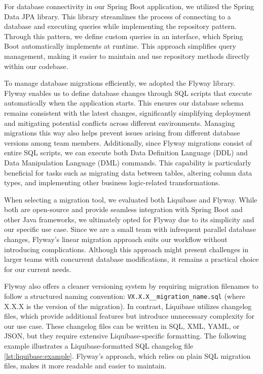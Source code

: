 For database connectivity in our Spring Boot application, we utilized the Spring Data JPA library. This library streamlines the process of connecting to a database and executing queries while implementing the repository pattern. Through this pattern, we define custom queries in an interface, which Spring Boot automatically implements at runtime. This approach simplifies query management, making it easier to maintain and use repository methods directly within our codebase.

To manage database migrations efficiently, we adopted the Flyway library. Flyway enables us to define database changes through SQL scripts that execute automatically when the application starts. This ensures our database schema remains consistent with the latest changes, significantly simplifying deployment and mitigating potential conflicts across different environments. Managing migrations this way also helps prevent issues arising from different database versions among team members. Additionally, since Flyway migrations consist of entire SQL scripts, we can execute both Data Definition Language (DDL) and Data Manipulation Language (DML) commands. This capability is particularly beneficial for tasks such as migrating data between tables, altering column data types, and implementing other business logic-related transformations.

When selecting a migration tool, we evaluated both Liquibase and Flyway. While both are open-source and provide seamless integration with Spring Boot and other Java frameworks, we ultimately opted for Flyway due to its simplicity and our specific use case. Since we are a small team with infrequent parallel database changes, Flyway’s linear migration approach suits our workflow without introducing complications. Although this approach might present challenges in larger teams with concurrent database modifications, it remains a practical choice for our current needs.

Flyway also offers a cleaner versioning system by requiring migration filenames to follow a structured naming convention: \texttt{VX.X.X\_\_migration\_name.sql} (where X.X.X is the version of the migration). In contrast, Liquibase utilizes changelog files, which provide additional features but introduce unnecessary complexity for our use case. These changelog files can be written in SQL, XML, YAML, or JSON, but they require extensive Liquibase-specific formatting. The following example illustrates a Liquibase-formatted SQL changelog file \ref{lst:liquibase:example}. Flyway’s approach, which relies on plain SQL migration files, makes it more readable and easier to maintain.

